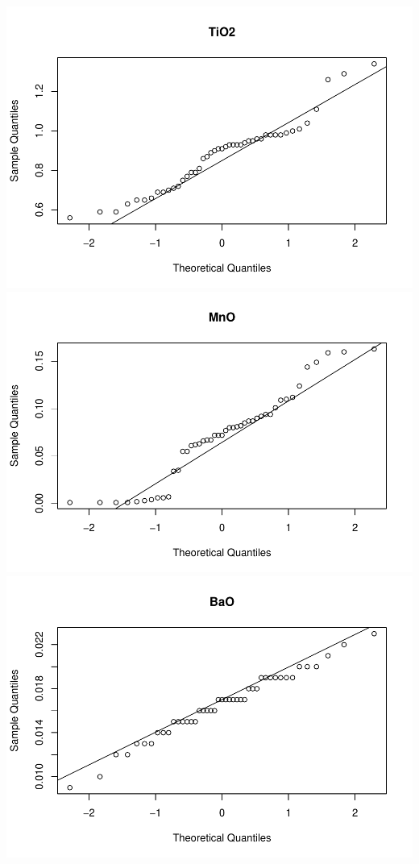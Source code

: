 \documentclass[
]{article}
\begin{document}
\includegraphics[width=0.33\linewidth,height=0.25\textheight]{hudm6122_hw_01_ChenguangPan_files/figure-latex/unnamed-chunk-3-7}
\includegraphics[width=0.33\linewidth,height=0.25\textheight]{hudm6122_hw_01_ChenguangPan_files/figure-latex/unnamed-chunk-3-8}
\includegraphics[width=0.33\linewidth,height=0.25\textheight]{hudm6122_hw_01_ChenguangPan_files/figure-latex/unnamed-chunk-3-9}
\end{document}
